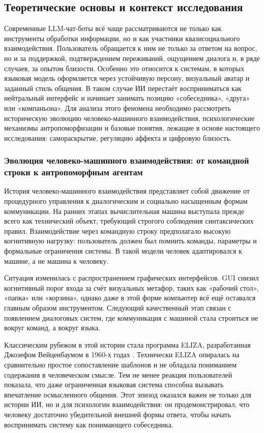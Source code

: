 \documentclass[areasetadvanced]{scrartcl}
\begin{document}
\subsection{Теоретические основы и контекст исследования}

Современные LLM-чат-боты всё чаще рассматриваются не только как
инструменты обработки информации, но и как участники квазисоциального
взаимодействия. Пользователь обращается к ним не только за ответом на
вопрос, но и за поддержкой, подтверждением переживаний, ощущением
диалога и, в ряде случаев, за опытом близости. Особенно это относится
к системам, в которых языковая модель оформляется через устойчивую
персону, визуальный аватар и заданный стиль общения. В таком случае ИИ
перестаёт восприниматься как нейтральный интерфейс и начинает занимать
позицию «собеседника», «друга» или «компаньона». Для анализа этого
феномена необходимо рассмотреть историческую эволюцию
человеко-машинного взаимодействия, психологические механизмы
антропоморфизации и базовые понятия, лежащие в основе настоящего
исследования: самораскрытие, регуляцию аффекта и цифровую близость.

\subsubsection{Эволюция человеко-машинного взаимодействия: от командной
строки к антропоморфным агентам}

История человеко-машинного взаимодействия представляет собой движение
от процедурного управления к диалогическим и социально насыщенным
формам коммуникации. На ранних этапах вычислительная машина выступала
прежде всего как технический объект, требующий строгого соблюдения
синтаксических правил. Взаимодействие через командную строку
предполагало высокую когнитивную нагрузку: пользователь должен был
помнить команды, параметры и формальные ограничения системы. В такой
модели человек адаптировался к машине, а не машина к человеку.

Ситуация изменилась с распространением графических интерфейсов. GUI
снизил когнитивный порог входа за счёт визуальных метафор, таких как
«рабочий стол», «папка» или «корзина», однако даже в этой форме
компьютер всё ещё оставался главным образом инструментом. Следующий
качественный этап связан с появлением диалоговых систем, где
коммуникация с машиной стала строиться не вокруг команд, а вокруг
языка.

Классическим рубежом в этой истории стала программа ELIZA,
разработанная Джозефом Вейценбаумом в 1960-х годах
\cite{Weizenbaum1966}. Технически ELIZA опиралась на сравнительно
простое сопоставление шаблонов и не обладала пониманием содержания в
человеческом смысле. Тем не менее реакция пользователей показала, что
даже ограниченная языковая система способна вызывать впечатление
осмысленного общения. Этот эпизод оказался важен не только для истории
ИИ, но и для психологии взаимодействия: он продемонстрировал, что
человеку достаточно убедительной внешней формы ответа, чтобы начать
воспринимать систему как понимающего собеседника.
\end{document}
